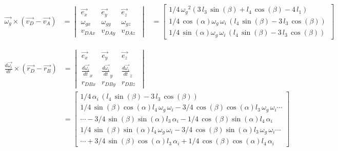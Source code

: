 \begin{equation*}
\begin{split}
\overrightarrow{\omega_{g}}\times(\overrightarrow{v_{D}}-\overrightarrow{v_{A}})
&=	\begin{vmatrix}
	\overrightarrow{e_{x}} & \overrightarrow{e_{y}} & \overrightarrow{e_{z}}\\
	\omega_{gx} & \omega_{gy} & \omega_{gz}\\
	v_{DAx} & v_{DAy} & v_{DAz}\
	\end{vmatrix}
&=	\begin{bmatrix}
	1/4\,{\omega_{g}}^{2} \left( 3\,l_{3}\,\sin\left( \beta \right) +l_{4}\,\cos \left( \beta \right) -4\,l_{1}\right) \\
	1/4\,\cos \left( \alpha \right) \omega_{g}\,\omega_{i}\, \left( l_{4}\,\sin \left( \beta \right) -3\,l_{3}\,\cos \left( \beta \right)  \right) \\
	1/4\,\sin\left( \alpha \right) \omega_{g}\,\omega_{i}\, \left( l_{4}\,\sin\left( \beta \right) -3\,l_{3}\,\cos \left( \beta \right)  \right) \
	\end{bmatrix}
\end{split}
\end{equation*}

\begin{equation*}
\begin{split}
\frac{d\overrightarrow{\omega_i}}{dt}\times(\overrightarrow{r_{D}}-\overrightarrow{r_{B}})
&=	\begin{vmatrix}
	\overrightarrow{e_{x}} & \overrightarrow{e_{y}} & \overrightarrow{e_{z}}\\
	\frac{d\overrightarrow{\omega_i}}{dt}_{x} & \frac{d\overrightarrow{\omega_i}}{dt}_{y} & \frac{d\overrightarrow{\omega_i}}{dt}_{z}\\
	r_{DBx} & r_{DBy} & r_{DBz}\
	\end{vmatrix}\\
&=	\begin{bmatrix}
	1/4\,\alpha_{i}\, \left( l_{4}\,\sin \left( \beta \right) -3\,l_{3}\,\cos \left( \beta \right)  \right) \\
	1/4\,\sin \left( \beta \right) \cos \left( \alpha\right) l_{4}\,\omega_{g}\,\omega_{i}-3/4\,\cos \left( \beta \right) \cos \left( \alpha \right) l_{3}\,\omega_{g}\,\omega_{i}\cdots\\
	\cdots-3/4\,\sin\left( \beta \right) \sin \left( \alpha \right) l_{3}\,\alpha_{i}-1/4\,\cos \left( \beta \right) \sin \left( \alpha \right) l_{4}\,\alpha_{i}\\
	1/4\,\sin \left( \beta \right) \sin \left( \alpha \right) l_{4}\,\omega_{g}\,\omega_{i}-3/4\,\cos \left( \beta\right) \sin \left( \alpha \right) l_{3}\,\omega_{g}\,\omega_{i}\cdots\\
	\cdots+3/4\,\sin \left( \beta \right) \cos \left( \alpha \right) l_{3}\,\alpha_{i}+1/4\,\cos \left( \beta \right) \cos \left( \alpha \right) l_{4}\,\alpha_{i}\
	\end{bmatrix}
\end{split}
\end{equation*}

